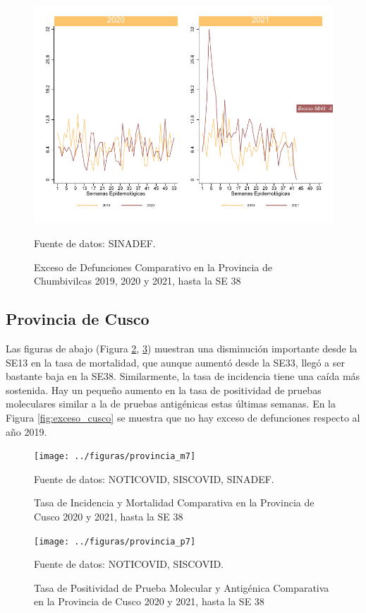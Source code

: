 \documentclass[12pt,a4paper,openany]{book}
\begin{document}
	\begin{figure}[h]
	\caption{Exceso de Defunciones Comparativo en la Provincia de Chumbivilcas 2019, 2020 y 2021, hasta la SE 38}\label{fig:exceso_chumbivilcas}
	\begin{center}
		\includegraphics[width=0.7\linewidth]{../figuras/exceso_6}
	\end{center}
	{\footnotesize {Fuente de datos: SINADEF.}}
	\end{figure}

\clearpage

	\subsection*{Provincia de Cusco}
	\noindent Las figuras de abajo (Figura \ref{fig:inc_mort_cusco}, \ref{fig:positividad_cusco})  muestran una disminución importante desde la SE13 en la tasa de mortalidad, que aunque aumentó desde la SE33, llegó a ser bastante baja en la SE38. Similarmente, la tasa de incidencia tiene una caída más sostenida. Hay un pequeño aumento en la tasa de positividad de pruebas moleculares similar a la de pruebas antigénicas estas últimas semanas. En la Figura \ref{fig:exceso_cusco} se muestra que no hay exceso de defunciones respecto al año 2019.

	\begin{figure}[h]
	\caption{Tasa de Incidencia y Mortalidad Comparativa en la Provincia de Cusco 2020 y 2021, hasta la SE 38}\label{fig:inc_mort_cusco}
	\begin{center}
		\texttt{[image: ../figuras/provincia\_m7]}
	\end{center}
	{\footnotesize {Fuente de datos: NOTICOVID, SISCOVID, SINADEF.}}
	\end{figure}

	\begin{figure}[h]
	\caption{Tasa de Positividad de Prueba Molecular y Antigénica Comparativa en la Provincia de Cusco 2020 y 2021, hasta la SE 38}\label{fig:positividad_cusco}
	\begin{center}
		\texttt{[image: ../figuras/provincia\_p7]}
	\end{center}
	{\footnotesize {Fuente de datos: NOTICOVID, SISCOVID.}}
	\end{figure}
\end{document}
